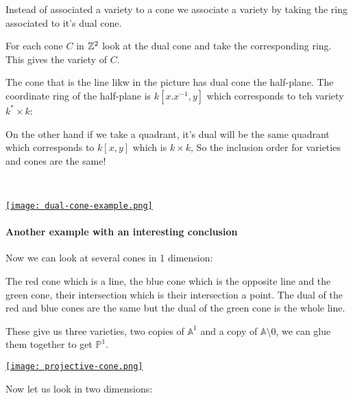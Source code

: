 Instead of associated a variety to a cone we associate a variety by taking the ring associated to it's dual cone.

For each cone $C$ in $\mathbb{Z}^2$ look at the dual cone and take the corresponding ring. This gives the variety of $C$. 

\begin{example}
    The cone that is the line likw in the picture has dual cone the half-plane. The coordinate ring of the half-plane is $k[x.x^{-1},y]$ which corresponds to teh variety $k^\ast \times k$:

    On the other hand if we take a quadrant, it's dual will be the same quadrant which corresponds to $k[x,y]$ which is $k\times k$, So the inclusion order for varieties and cones are the same!

    \

    \href{https://youtu.be/Sjp-99Xyiic?t=662}{\texttt{[image: dual-cone-example.png]}}
\end{example}

\paragraph*{Another example with an interesting conclusion}


Now we can look at several cones in 1 dimension:

\begin{example}
The red cone which is a line, the blue cone which is the opposite line and the green cone, their intersection which is their intersection a point. The dual of the red and blue cones are the same but the dual of the green cone is the whole line. 

    These give us three varieties, two copies of $\mathbb{A}^1$ and a copy of $\mathbb{A}\setminus 0$, we can glue them together to get $\mathbb{P}^1$.
    
    
    \href{https://youtu.be/Sjp-99Xyiic?t=848}{\texttt{[image: projective-cone.png]}}
\end{example}

Now let us look in two dimensions:

